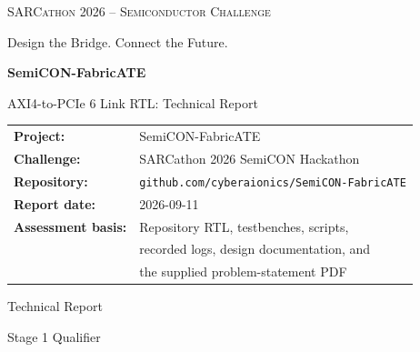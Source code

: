 \documentclass[11pt,a4paper]{article}
\newcommand{\code}[1]{\texttt{#1}}
\newcommand{\reporttitle}{SemiCON-FabricATE}
\newcommand{\reportsubtitle}{AXI4-to-PCIe 6 Link RTL: Technical Report}
\begin{document}
\begin{titlepage}
    \centering
    \vspace*{1.2cm}

    {\scshape\Large SARCathon 2026 -- Semiconductor Challenge\par}
    \vspace{0.4cm}
    {\large Design the Bridge. Connect the Future.\par}

    \vspace{2.2cm}

    {\Huge\bfseries \reporttitle\par}
    \vspace{0.6cm}
    {\Large \reportsubtitle\par}

    \vspace{1.5cm}

    \begin{tabular}{>{\bfseries}ll}
        Project: & SemiCON-FabricATE \\
        Challenge: & SARCathon 2026 SemiCON Hackathon \\
        Repository: & \code{github.com/cyberaionics/SemiCON-FabricATE} \\
        Report date: & 2026-09-11 \\
        Assessment basis: & Repository RTL, testbenches, scripts, \\
        & recorded logs, design documentation, and \\
        & the supplied problem-statement PDF \\
    \end{tabular}

    \vfill

    {\large Technical Report\par}
    \vspace{0.3cm}
    {\large Stage 1 Qualifier \par}
\end{titlepage}

\tableofcontents
\newpage

\end{document}
